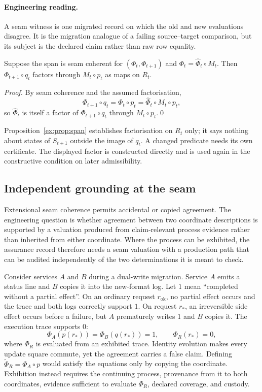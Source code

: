 \documentclass[smallextended,envcountsect,envcountsame,natbib]{svjour3}
\begin{document}
\paragraph{Engineering reading.} A seam witness is one migrated record on which the old and new evaluations disagree. It is the migration analogue of a failing source--target comparison, but its subject is the declared claim rather than raw row equality.

\begin{proposition}\label{ex:prop:span}
Suppose the span is seam coherent for $(\Phi_t,\Phi_{t+1})$ and $\Phi_t=\widehat\Phi_t \circ M_t$. Then $\Phi_{t+1} \circ q_t$ factors through $M_t \circ p_t$ as maps on $R_t$.
\end{proposition}

\begin{proof}
By seam coherence and the assumed factorisation,
\[
\Phi_{t+1}\circ q_t=\Phi_t\circ p_t=\widehat\Phi_t\circ M_t\circ p_t,
\]
so $\widehat\Phi_t$ is itself a factor of $\Phi_{t+1}\circ q_t$ through $M_t\circ p_t$.\qed
\end{proof}

Proposition~\ref{ex:prop:span} establishes factorisation on $R_t$ only; it says nothing about states of $S_{t+1}$ outside the image of $q_t$. A changed predicate needs its own certificate. The displayed factor is constructed directly and is used again in the constructive condition on later admissibility.

\subsection{Independent grounding at the seam}\label{ex:sec:grounding-seam}

Extensional seam coherence permits accidental or copied agreement. The engineering question is whether agreement between two coordinate descriptions is supported by a valuation produced from claim-relevant process evidence rather than inherited from either coordinate. Where the process can be exhibited, the assurance record therefore needs a seam valuation with a production path that can be audited independently of the two determinations it is meant to check.

Consider services $A$ and $B$ during a dual-write migration. Service $A$ emits a status line and $B$ copies it into the new-format log. Let $1$ mean ``completed without a partial effect''. On an ordinary request $r_{\mathrm{ok}}$, no partial effect occurs and the trace and both logs correctly support $1$. On request $r_*$, an irreversible side effect occurs before a failure, but $A$ prematurely writes $1$ and $B$ copies it. The execution trace supports $0$:
\[
\Phi_A(p(r_*))
=\Phi_B(q(r_*))=1,
\qquad
\Phi_R(r_*)=0,
\]
where $\Phi_R$ is evaluated from an exhibited trace. Identity evolution makes every update square commute, yet the agreement carries a false claim. Defining $\widetilde\Phi_R=\Phi_A\circ p$ would satisfy the equations only by copying the coordinate. Exhibition instead requires the continuing process, provenance from it to both coordinates, evidence sufficient to evaluate $\Phi_R$, declared coverage, and custody.
\end{document}
